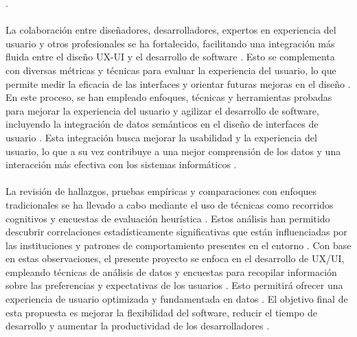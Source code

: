 \documentclass[12pt,a4paper]{article}
\begin{document}
\cite{Klock2017}
\cite{Hassan2017}
.
\\\\
La colaboración entre diseñadores, desarrolladores, expertos en experiencia del usuario y otros profesionales se ha fortalecido, facilitando una integración más fluida entre el diseño UX-UI y el desarrollo de software
\cite{Duftschmid2010}
\cite{Allones2013}
\cite{Morup2012}
. Esto se complementa con diversas métricas y técnicas para evaluar la experiencia del usuario, lo que permite medir la eficacia de las interfaces y orientar futuras mejoras en el diseño
\cite{Gouvas2016}
\cite{Gopu2016}
\cite{Cosenz2017}
. En este proceso, se han empleado enfoques, técnicas y herramientas probadas para mejorar la experiencia del usuario y agilizar el desarrollo de software, incluyendo la integración de datos semánticos en el diseño de interfaces de usuario
\cite{Guo2015}
\cite{Vaclav2017}
. Esta integración busca mejorar la usabilidad y la experiencia del usuario, lo que a su vez contribuye a una mejor comprensión de los datos y una interacción más efectiva con los sistemas informáticos
\cite{Marco-Ruiz2015}
\cite{JansenBosch}
.
\\\\
La revisión de hallazgos, pruebas empíricas y comparaciones con enfoques tradicionales se ha llevado a cabo mediante el uso de técnicas como recorridos cognitivos y encuestas de evaluación heurística
\cite{Hassan2016813}
\cite{Batini1992}
. Estos análisis han permitido descubrir correlaciones estadísticamente significativas que están influenciadas por las instituciones y patrones de comportamiento presentes en el entorno
\cite{Esposito201610}
\cite{Ferreira2017}
\cite{Feras2022}
. Con base en estas observaciones, el presente proyecto se enfoca en el desarrollo de UX/UI, empleando técnicas de análisis de datos y encuestas para recopilar información sobre las preferencias y expectativas de los usuarios
\cite{Stacey2017}
\cite{Upadhyay2023}
\cite{Zhao2008}
. Esto permitirá ofrecer una experiencia de usuario optimizada y fundamentada en datos
\cite{Gibbs2015}
\cite{Catalina2008}
. El objetivo final de esta propuesta es mejorar la flexibilidad del software, reducir el tiempo de desarrollo y aumentar la productividad de los desarrolladores
\cite{Moner2018}
\cite{Alomari2020}
.
\end{document}
